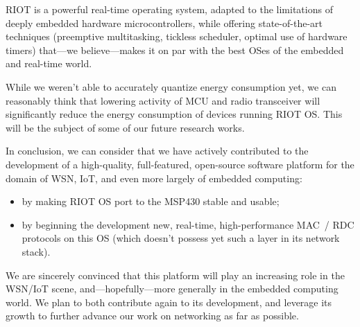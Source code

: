 \documentclass[a4paper,twoside]{article}
\begin{document}
RIOT is a powerful real-time operating system, adapted to the limitations
of deeply embedded hardware microcontrollers, while offering state-of-the-art
techniques (preemptive multitasking, tickless scheduler, optimal use
of hardware timers) that---we believe---makes it on par with
the best OSes of the embedded and real-time world.

While we weren't able to accurately quantize energy consumption
yet, we can reasonably think that lowering activity of MCU and radio
transceiver will significantly reduce the energy consumption of devices
running RIOT OS. This will be the subject of some of our future
research works.

\bigskip

In conclusion, we can consider that we have actively contributed to the
development of a high-quality, full-featured, open-source software platform
for the domain of WSN, IoT, and even more largely of embedded computing:

\begin{itemize}

\item by making RIOT OS port to the MSP430 stable and usable;

\item by beginning the development new, real-time, high-performance
      MAC~/ RDC protocols on this OS (which doesn't possess yet such
      a layer in its network stack).

\end{itemize}

We are sincerely convinced that this platform will play an increasing role
in the WSN/IoT scene, and---hopefully---more generally in the embedded
computing world. We plan to both contribute again to its development,
and leverage its growth to further advance our work on networking
as far as possible.





\vfill

{\small
}
\end{document}
